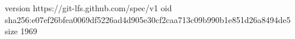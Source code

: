 version https://git-lfs.github.com/spec/v1
oid sha256:e07ef26bfea0069df5226ad4d905e30cf2caa713c09b990b1e851d26a8494de5
size 1969
